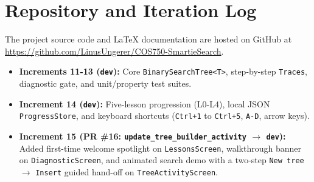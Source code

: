 
\section{Repository and Iteration Log}
The project source code and LaTeX documentation are hosted on GitHub at \url{https://github.com/LinusUngerer/COS750-SmartieSearch}.
\begin{itemize}
    \item \textbf{Increments 11-13 (\texttt{dev}):} Core \texttt{BinarySearchTree<T>}, step-by-step \texttt{Traces}, diagnostic gate, and unit/property test suites.
    \item \textbf{Increment 14 (\texttt{dev}):} Five-lesson progression (L0-L4), local JSON \texttt{ProgressStore}, and keyboard shortcuts (\texttt{Ctrl+1} to \texttt{Ctrl+5}, \texttt{A-D}, arrow keys).
    \item \textbf{Increment 15 (PR \#16: \texttt{update\_tree\_builder\_activity} $\rightarrow$ \texttt{dev}):} Added first-time welcome spotlight on \texttt{LessonsScreen}, walkthrough banner on \texttt{DiagnosticScreen}, and animated search demo with a two-step \texttt{New tree} $\rightarrow$ \texttt{Insert} guided hand-off on \texttt{TreeActivityScreen}.
\end{itemize}

